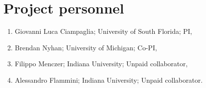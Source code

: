 \section*{Project personnel}

\begin{enumerate}[noitemsep]
    \item Giovanni Luca Ciampaglia; University of South Florida; PI,
    \item Brendan Nyhan; University of Michigan; Co-PI,
    \item Filippo Menczer; Indiana University; Unpaid collaborator,
    \item Alessandro Flammini; Indiana University; Unpaid collaborator.
\end{enumerate}